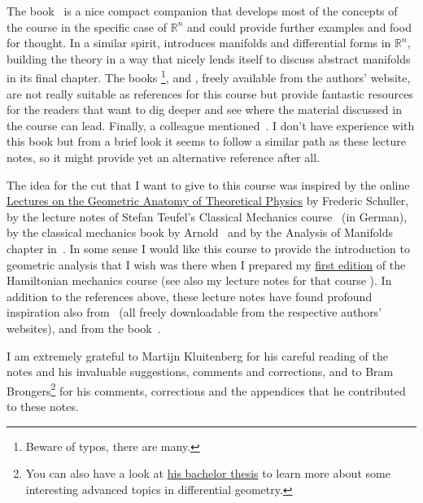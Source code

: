 \documentclass[nobib, a4paper]{tufte-book}
\theoremstyle{plain}
\theoremstyle{definition}
\theoremstyle{remark}
\newcommand{\R}{\mathbb{R}}
\begin{document}
The book~\cite{book:McInerney} is a nice compact companion that develops most of the concepts of the course in the specific case of $\R^n$ and could provide further examples and food for thought.
In a similar spirit, \cite{book:munkres} introduces manifolds and differential forms in $\R^n$, building the theory in a way that nicely lends itself to discuss abstract manifolds in its final chapter.
The books \cite{book:nicolaescu}\footnote{Beware of typos, there are many.}, \cite{book:crane} and \cite{lectures:nanda}, freely available from the authors' website, are not really suitable as references for this course but provide fantastic resources for the readers that want to dig deeper and see where the material discussed in the course can lead.
Finally, a colleague mentioned~\cite{book:lang}. I don't have experience with this book but from a brief look it seems to follow a similar path as these lecture notes, so it might provide yet an alternative reference after all.

The idea for the cut that I want to give to this course was inspired by the online \href{https://www.video.uni-erlangen.de/course/id/242}{Lectures on the Geometric Anatomy of Theoretical Physics} by Frederic Schuller, by the lecture notes of Stefan Teufel's Classical Mechanics course~\cite{lectures:teufel} (in German), by the classical mechanics book by Arnold~\cite{book:arnold} and by the Analysis of Manifolds chapter in~\cite{book:thirring}.
In some sense I would like this course to provide the introduction to geometric analysis that I wish was there when I prepared my \href{https://www.mseri.me/lecture-notes-hamiltonian-mechanics/}{first edition} of the Hamiltonian mechanics course (see also my lecture notes for that course \cite{lectures:seri:hm}).
In addition to the references above, these lecture notes have found profound inspiration also from~\cite{lectures:merry,lectures:hitchin} (all freely downloadable from the respective authors' websites), and from the book~\cite{book:abrahammarsdenratiu}.
\medskip

I am extremely grateful to Martijn Kluitenberg for his careful reading of the notes and his invaluable suggestions, comments and corrections, and to Bram Brongers\footnote{You can also have a look at \href{https://fse.studenttheses.ub.rug.nl/25344/}{his bachelor thesis} to learn more about some interesting advanced topics in differential geometry.} for his comments, corrections and the appendices that he contributed to these notes.
\medskip
\end{document}
